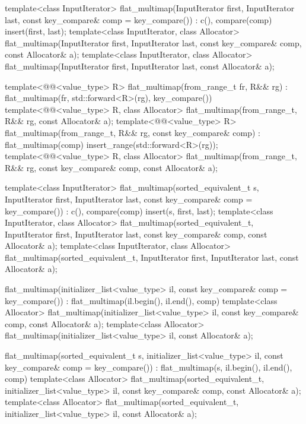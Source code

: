 \begin{codeblock}
{{    template<class InputIterator>
      flat_multimap(InputIterator first, InputIterator last,
                    const key_compare& comp = key_compare())
        : c(), compare(comp)
        { insert(first, last); }
    template<class InputIterator, class Allocator>
      flat_multimap(InputIterator first, InputIterator last,
                    const key_compare& comp, const Allocator& a);
    template<class InputIterator, class Allocator>
      flat_multimap(InputIterator first, InputIterator last, const Allocator& a);

    template<@@<value_type> R>
      flat_multimap(from_range_t fr, R&& rg)
        : flat_multimap(fr, std::forward<R>(rg), key_compare()) { }
    template<@@<value_type> R, class Allocator>
      flat_multimap(from_range_t, R&& rg, const Allocator& a);
    template<@@<value_type> R>
      flat_multimap(from_range_t, R&& rg, const key_compare& comp)
        : flat_multimap(comp) { insert_range(std::forward<R>(rg)); }
    template<@@<value_type> R, class Allocator>
      flat_multimap(from_range_t, R&& rg, const key_compare& comp, const Allocator& a);

    template<class InputIterator>
      flat_multimap(sorted_equivalent_t s, InputIterator first, InputIterator last,
                    const key_compare& comp = key_compare())
        : c(), compare(comp) { insert(s, first, last); }
    template<class InputIterator, class Allocator>
      flat_multimap(sorted_equivalent_t, InputIterator first, InputIterator last,
                    const key_compare& comp, const Allocator& a);
    template<class InputIterator, class Allocator>
      flat_multimap(sorted_equivalent_t, InputIterator first, InputIterator last,
                    const Allocator& a);

    flat_multimap(initializer_list<value_type> il, const key_compare& comp = key_compare())
        : flat_multimap(il.begin(), il.end(), comp) { }
    template<class Allocator>
      flat_multimap(initializer_list<value_type> il, const key_compare& comp,
                    const Allocator& a);
    template<class Allocator>
      flat_multimap(initializer_list<value_type> il, const Allocator& a);

    flat_multimap(sorted_equivalent_t s, initializer_list<value_type> il,
                  const key_compare& comp = key_compare())
        : flat_multimap(s, il.begin(), il.end(), comp) { }
    template<class Allocator>
      flat_multimap(sorted_equivalent_t, initializer_list<value_type> il,
                    const key_compare& comp, const Allocator& a);
    template<class Allocator>
      flat_multimap(sorted_equivalent_t, initializer_list<value_type> il, const Allocator& a);

}}
\end{codeblock}
